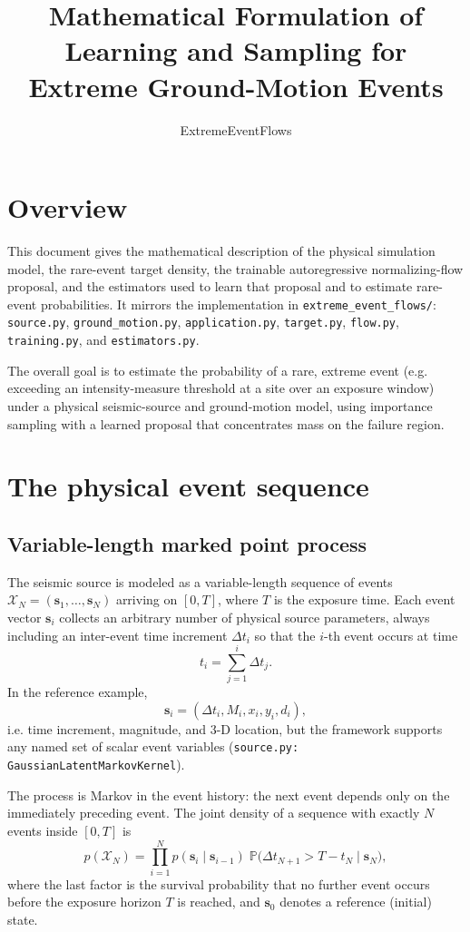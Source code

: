 \documentclass[11pt]{article}
\title{Mathematical Formulation of Learning and Sampling for\\ Extreme Ground-Motion Events}
\author{ExtremeEventFlows}
\date{}
\newcommand{\Prob}{\mathbb{P}}
\newcommand{\dt}{\Delta t}
\newcommand{\bs}{\mathbf s}
\begin{document}
\maketitle

\tableofcontents

\section{Overview}

This document gives the mathematical description of the physical simulation model,
the rare-event target density, the trainable autoregressive normalizing-flow proposal,
and the estimators used to learn that proposal and to estimate rare-event
probabilities. It mirrors the implementation in \texttt{extreme\_event\_flows/}:
\texttt{source.py}, \texttt{ground\_motion.py}, \texttt{application.py},
\texttt{target.py}, \texttt{flow.py}, \texttt{training.py}, and
\texttt{estimators.py}.

The overall goal is to estimate the probability of a rare, extreme event
(e.g. exceeding an intensity-measure threshold at a site over an exposure window)
under a physical seismic-source and ground-motion model, using importance
sampling with a learned proposal that concentrates mass on the failure region.

\section{The physical event sequence}

\subsection{Variable-length marked point process}

The seismic source is modeled as a variable-length sequence of events
$\mathcal X_N = (\bs_1,\dots,\bs_N)$ arriving on $[0,T]$, where $T$ is the
exposure time. Each event vector $\bs_i$ collects an arbitrary number of
physical source parameters, always including an inter-event time increment
$\dt_i$ so that the $i$-th event occurs at time
\[
t_i = \sum_{j=1}^i \dt_j .
\]
In the reference example,
\[
\bs_i = (\dt_i, M_i, x_i, y_i, d_i),
\]
i.e. time increment, magnitude, and 3-D location, but the framework supports
any named set of scalar event variables (\texttt{source.py:
GaussianLatentMarkovKernel}).

The process is Markov in the event history: the next event depends only on
the immediately preceding event. The joint density of a sequence with exactly
$N$ events inside $[0,T]$ is
\begin{equation}
p(\mathcal X_N)
=
\prod_{i=1}^{N} p(\bs_i \mid \bs_{i-1})\;
\Prob\big(\dt_{N+1} > T - t_N \mid \bs_N\big),
\label{eq:joint-source}
\end{equation}
where the last factor is the survival probability that no further event
occurs before the exposure horizon $T$ is reached, and $\bs_0$ denotes a
reference (initial) state.
\end{document}
